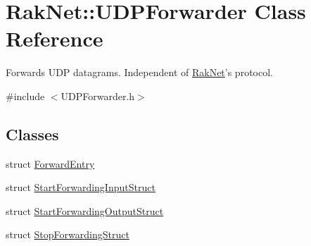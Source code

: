 \hypertarget{class_rak_net_1_1_u_d_p_forwarder}{\section{Rak\-Net\-:\-:U\-D\-P\-Forwarder Class Reference}
\label{class_rak_net_1_1_u_d_p_forwarder}
}


Forwards U\-D\-P datagrams. Independent of \hyperlink{namespace_rak_net}{Rak\-Net}'s protocol.  




{\ttfamily \#include $<$U\-D\-P\-Forwarder.\-h$>$}

\subsection*{Classes}
\begin{DoxyCompactItemize}
\item 
struct \hyperlink{struct_rak_net_1_1_u_d_p_forwarder_1_1_forward_entry}{Forward\-Entry}
\item 
struct \hyperlink{struct_rak_net_1_1_u_d_p_forwarder_1_1_start_forwarding_input_struct}{Start\-Forwarding\-Input\-Struct}
\item 
struct \hyperlink{struct_rak_net_1_1_u_d_p_forwarder_1_1_start_forwarding_output_struct}{Start\-Forwarding\-Output\-Struct}
\item 
struct \hyperlink{struct_rak_net_1_1_u_d_p_forwarder_1_1_stop_forwarding_struct}{Stop\-Forwarding\-Struct}
\end{DoxyCompactItemize}
